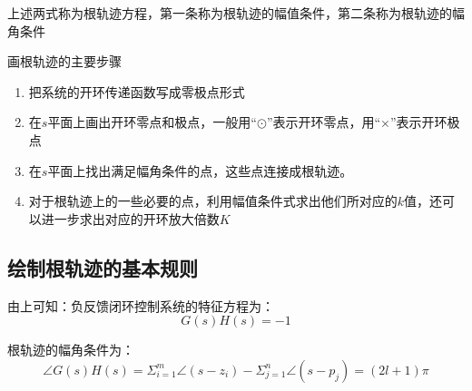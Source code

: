 上述两式称为根轨迹方程，第一条称为根轨迹的幅值条件，第二条称为根轨迹的幅角条件

\begin{ascolorbox9}{画根轨迹的主要步骤}
    \begin{enumerate}
        \item 把系统的开环传递函数写成零极点形式
        \item 在$s$平面上画出开环零点和极点，一般用“$ \odot $”表示开环零点，用“$\times$”表示开环极点
        \item 在$s$平面上找出满足幅角条件的点，这些点连接成根轨迹。
        \item 对于根轨迹上的一些必要的点，利用幅值条件式求出他们所对应的$k$值，还可以进一步求出对应的开环放大倍数$K$
    \end{enumerate}
\end{ascolorbox9}

\subsection{绘制根轨迹的基本规则}

由上可知：负反馈闭环控制系统的特征方程为：
\begin{equation*}
    G(s) H(s) = -1
\end{equation*}

根轨迹的幅角条件为：
\begin{equation*}
    \angle G(s) H(s) = \Sigma_{i=1}^m \angle(s-z_i) - \Sigma_{j=1}^n \angle(s-p_j) = (2l+1)\pi
\end{equation*}

